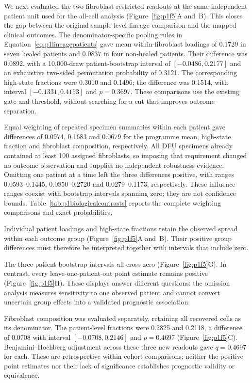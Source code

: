 \documentclass[10pt,a4paper]{article}
\begin{document}
We next evaluated the two fibroblast-restricted readouts at the same independent patient unit used for the all-cell analysis (Figure~\ref{fig:p1f5}A and~B). This closes the gap between the original sample-level lineage comparison and the mapped clinical outcomes. The denominator-specific pooling rules in Equation~\eqref{eq:p1lineagepatients} gave mean within-fibroblast loadings of 0.1729 in seven healed patients and 0.0837 in four non-healed patients. Their difference was 0.0892, with a 10,000-draw patient-bootstrap interval of $[-0.0486,0.2177]$ and an exhaustive two-sided permutation probability of 0.3121. The corresponding high-state fractions were 0.3010 and 0.1496; the difference was 0.1514, with interval $[-0.1331,0.4153]$ and $p=0.3697$. These comparisons use the existing gate and threshold, without searching for a cut that improves outcome separation.

Equal weighting of repeated specimen summaries within each patient gave differences of 0.0974, 0.1683 and 0.0679 for the programme mean, high-state fraction and fibroblast composition, respectively. All DFU specimens already contained at least 100 assigned fibroblasts, so imposing that requirement changed no outcome observation and supplies no independent robustness evidence. Omitting one patient at a time left the three differences positive, with ranges 0.0593--0.1445, 0.0850--0.2720 and 0.0279--0.1173, respectively. These influence ranges coexist with bootstrap intervals spanning zero; they are not confidence bounds. Table~\ref{tab:p1biologicalcontrasts} reports the complete weighting comparisons and exact probabilities.

Individual patient loadings and high-state fractions retain the observed spread within each outcome group (Figure~\ref{fig:p1f5}A and~B). Their positive group differences must therefore be interpreted together with intervals that include zero.

The three patient-bootstrap intervals all cross zero (Figure~\ref{fig:p1f5}G). In contrast, every leave-one-patient-out point estimate remains positive (Figure~\ref{fig:p1f5}H). These displays answer different questions: the omission analysis measures sensitivity to one observed patient and cannot convert uncertain group effects into a validated prognostic association.

Fibroblast composition was evaluated separately, retaining all recovered cells as its denominator. The patient-level fractions were 0.2825 and 0.2118, a difference of 0.0708 with interval $[-0.0708,0.2146]$ and $p=0.4697$ (Figure~\ref{fig:p1f5}C). Benjamini--Hochberg adjustment across these three new readouts gave $q=0.4697$ for each. These are retrospective within-cohort comparisons; neither the positive point estimates nor their lack of significance establishes prognostic validity or equivalence.
\end{document}
